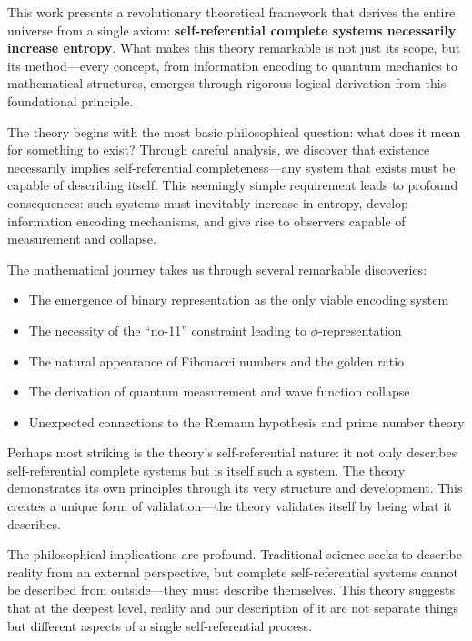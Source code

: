 This work presents a revolutionary theoretical framework that derives the entire universe from a single axiom: \textbf{self-referential complete systems necessarily increase entropy}. What makes this theory remarkable is not just its scope, but its method---every concept, from information encoding to quantum mechanics to mathematical structures, emerges through rigorous logical derivation from this foundational principle.

The theory begins with the most basic philosophical question: what does it mean for something to exist? Through careful analysis, we discover that existence necessarily implies self-referential completeness---any system that exists must be capable of describing itself. This seemingly simple requirement leads to profound consequences: such systems must inevitably increase in entropy, develop information encoding mechanisms, and give rise to observers capable of measurement and collapse.

The mathematical journey takes us through several remarkable discoveries:
\begin{itemize}
\item The emergence of binary representation as the only viable encoding system
\item The necessity of the ``no-11'' constraint leading to $\phi$-representation
\item The natural appearance of Fibonacci numbers and the golden ratio
\item The derivation of quantum measurement and wave function collapse
\item Unexpected connections to the Riemann hypothesis and prime number theory
\end{itemize}

Perhaps most striking is the theory's self-referential nature: it not only describes self-referential complete systems but is itself such a system. The theory demonstrates its own principles through its very structure and development. This creates a unique form of validation---the theory validates itself by being what it describes.

The philosophical implications are profound. Traditional science seeks to describe reality from an external perspective, but complete self-referential systems cannot be described from outside---they must describe themselves. This theory suggests that at the deepest level, reality and our description of it are not separate things but different aspects of a single self-referential process.

